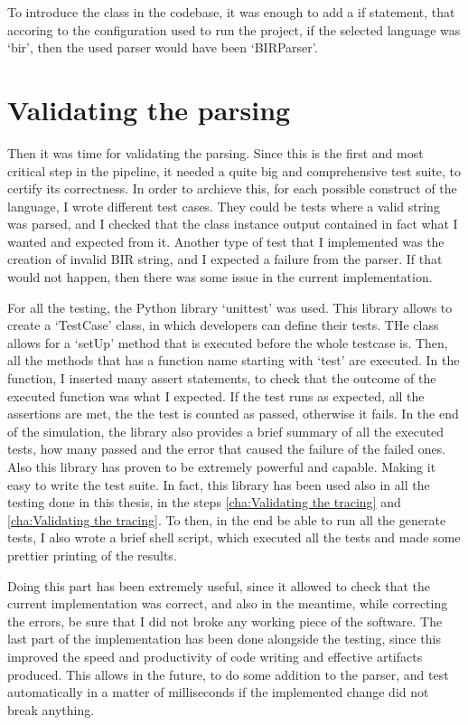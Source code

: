 To introduce the class in the codebase, it was enough to add a if statement, that
accoring to the configuration used to run the project, if the selected language
was `bir', then the used parser would have been `BIRParser'.

\section{Validating the parsing}
\label{cha:Validating the parsing} Then it was time for validating the parsing.
Since this is the first and most critical step in the pipeline, it needed a quite
big and comprehensive test suite, to certify its correctness. In order to archieve
this, for each possible construct of the language, I wrote different test cases.
They could be tests where a valid string was parsed, and I checked that the class
instance output contained in fact what I wanted and expected from it. Another
type of test that I implemented was the creation of invalid BIR string, and I expected
a failure from the parser. If that would not happen, then there was some issue in
the current implementation.

For all the testing, the Python library `unittest' was used. This library allows
to create a `TestCase' class, in which developers can define their tests. THe class
allows for a `setUp' method that is executed before the whole testcase is. Then,
all the methods that has a function name starting with `test' are executed. In
the function, I inserted many assert statements, to check that the outcome of
the executed function was what I expected. If the test runs as expected, all the
assertions are met, the the test is counted as passed, otherwise it fails. In the
end of the simulation, the library also provides a brief summary of all the
executed tests, how many passed and the error that caused the failure of the failed
ones. Also this library has proven to be extremely powerful and capable. Making it
easy to write the test suite. In fact, this library has been used also in all the
testing done in this thesis, in the steps \ref{cha:Validating the tracing} and
\ref{cha:Validating the tracing}. To then, in the end be able to run all the
generate tests, I also wrote a brief shell script, which executed all the tests
and made some prettier printing of the results.

Doing this part has been extremely useful, since it allowed to check that the current
implementation was correct, and also in the meantime, while correcting the errors,
be sure that I did not broke any working piece of the software. The last part of
the implementation has been done alongside the testing, since this improved the
speed and productivity of code writing and effective artifacts produced. This allows
in the future, to do some addition to the parser, and test automatically in a matter
of milliseconds if the implemented change did not break anything.

